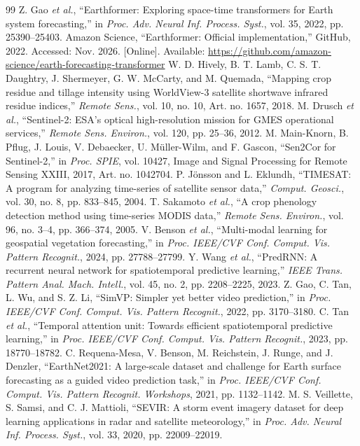 \documentclass[journal]{IEEEtran}
\begin{document}
\begin{thebibliography}{99}
 Z. Gao \emph{et al.}, ``Earthformer: Exploring space-time transformers for Earth system forecasting,'' in \emph{Proc. Adv. Neural Inf. Process. Syst.}, vol. 35, 2022, pp. 25390--25403.
 Amazon Science, ``Earthformer: Official implementation,'' GitHub, 2022. Accessed: Nov. 2026. [Online]. Available: \url{https://github.com/amazon-science/earth-forecasting-transformer}
 W. D. Hively, B. T. Lamb, C. S. T. Daughtry, J. Shermeyer, G. W. McCarty, and M. Quemada, ``Mapping crop residue and tillage intensity using WorldView-3 satellite shortwave infrared residue indices,'' \emph{Remote Sens.}, vol. 10, no. 10, Art. no. 1657, 2018.
 M. Drusch \emph{et al.}, ``Sentinel-2: ESA's optical high-resolution mission for GMES operational services,'' \emph{Remote Sens. Environ.}, vol. 120, pp. 25--36, 2012.
 M. Main-Knorn, B. Pflug, J. Louis, V. Debaecker, U. M\"{u}ller-Wilm, and F. Gascon, ``Sen2Cor for Sentinel-2,'' in \emph{Proc. SPIE}, vol. 10427, Image and Signal Processing for Remote Sensing XXIII, 2017, Art. no. 1042704.
 P. J\"{o}nsson and L. Eklundh, ``TIMESAT: A program for analyzing time-series of satellite sensor data,'' \emph{Comput. Geosci.}, vol. 30, no. 8, pp. 833--845, 2004.
 T. Sakamoto \emph{et al.}, ``A crop phenology detection method using time-series MODIS data,'' \emph{Remote Sens. Environ.}, vol. 96, no. 3--4, pp. 366--374, 2005.
 V. Benson \emph{et al.}, ``Multi-modal learning for geospatial vegetation forecasting,'' in \emph{Proc. IEEE/CVF Conf. Comput. Vis. Pattern Recognit.}, 2024, pp. 27788--27799.
 Y. Wang \emph{et al.}, ``PredRNN: A recurrent neural network for spatiotemporal predictive learning,'' \emph{IEEE Trans. Pattern Anal. Mach. Intell.}, vol. 45, no. 2, pp. 2208--2225, 2023.
 Z. Gao, C. Tan, L. Wu, and S. Z. Li, ``SimVP: Simpler yet better video prediction,'' in \emph{Proc. IEEE/CVF Conf. Comput. Vis. Pattern Recognit.}, 2022, pp. 3170--3180.
 C. Tan \emph{et al.}, ``Temporal attention unit: Towards efficient spatiotemporal predictive learning,'' in \emph{Proc. IEEE/CVF Conf. Comput. Vis. Pattern Recognit.}, 2023, pp. 18770--18782.
 C. Requena-Mesa, V. Benson, M. Reichstein, J. Runge, and J. Denzler, ``EarthNet2021: A large-scale dataset and challenge for Earth surface forecasting as a guided video prediction task,'' in \emph{Proc. IEEE/CVF Conf. Comput. Vis. Pattern Recognit. Workshops}, 2021, pp. 1132--1142.
 M. S. Veillette, S. Samsi, and C. J. Mattioli, ``SEVIR: A storm event imagery dataset for deep learning applications in radar and satellite meteorology,'' in \emph{Proc. Adv. Neural Inf. Process. Syst.}, vol. 33, 2020, pp. 22009--22019.

\end{thebibliography}
\end{document}
